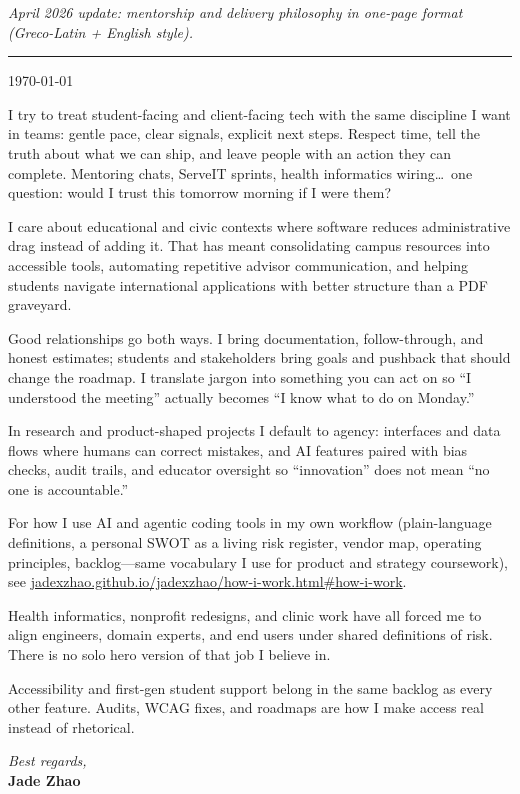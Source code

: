 \documentclass[11pt]{article}
\begin{document}

\vspace{0.35em}
\noindent\textit{April 2026 update: mentorship and delivery philosophy in one-page format (Greco-Latin + English style).}

\vspace{0.5em}
\noindent\rule{\linewidth}{1pt}
\vspace{0.75em}

\noindent\today

\vspace{0.75em}

I try to treat student-facing and client-facing tech with the same discipline I want in teams: gentle pace, clear signals, explicit next steps. Respect time, tell the truth about what we can ship, and leave people with an action they can complete. Mentoring chats, ServeIT sprints, health informatics wiring\ldots\ one question: would I trust this tomorrow morning if I were them?

I care about educational and civic contexts where software reduces administrative drag instead of adding it. That has meant consolidating campus resources into accessible tools, automating repetitive advisor communication, and helping students navigate international applications with better structure than a PDF graveyard.

Good relationships go both ways. I bring documentation, follow-through, and honest estimates; students and stakeholders bring goals and pushback that should change the roadmap. I translate jargon into something you can act on so ``I understood the meeting'' actually becomes ``I know what to do on Monday.''

In research and product-shaped projects I default to agency: interfaces and data flows where humans can correct mistakes, and AI features paired with bias checks, audit trails, and educator oversight so ``innovation'' does not mean ``no one is accountable.''

For how I use AI and agentic coding tools in my own workflow (plain-language definitions, a personal SWOT as a living risk register, vendor map, operating principles, backlog---same vocabulary I use for product and strategy coursework), see \href{https://jadexzhao.github.io/jadexzhao/how-i-work.html\#how-i-work}{jadexzhao.github.io/jadexzhao/how-i-work.html\#how-i-work}.

Health informatics, nonprofit redesigns, and clinic work have all forced me to align engineers, domain experts, and end users under shared definitions of risk. There is no solo hero version of that job I believe in.

Accessibility and first-gen student support belong in the same backlog as every other feature. Audits, WCAG fixes, and roadmaps are how I make access real instead of rhetorical.

\vspace{1.5em}
\noindent\textit{Best regards,}\\
\textbf{Jade Zhao}
\end{document}
